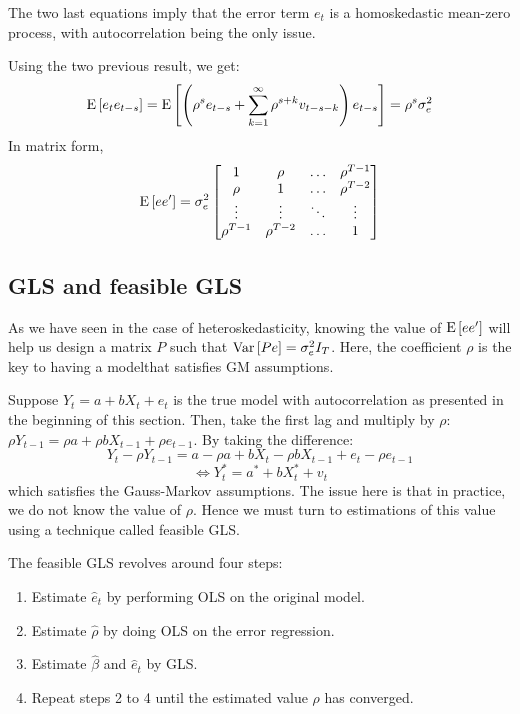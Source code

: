 The two last equations imply that the error term $e_t$ is a homoskedastic mean-zero process, with autocorrelation being the only issue.

Using the two previous result, we get: $$\operatorname{E}\left[e_te_{t-s}\right] = \operatorname{E}\left[\left(\rho^s e_{t-s} + \sum_{k=1}^{\infty} \rho^{s+k} v_{t-s-k}\right)e_{t-s}\right] = \rho^s \sigma_e^2 $$ In matrix form, \begin{align*}
\operatorname{E}\left[ee'\right] = \sigma_e^2 \begin{bmatrix}
1 & \rho & \hdots & \rho^{T-1} \\
\rho & 1 & \hdots & \rho^{T-2} \\
\vdots & \vdots	& \ddots & \vdots\\
\rho^{T-1} & \rho^{T-2} & \hdots & 1
\end{bmatrix}
\end{align*}

\subsection{GLS and feasible GLS}

As we have seen in the case of heteroskedasticity, knowing the value of $\operatorname{E}\left[ee'\right]$ will help us design a matrix $P$ such that $\operatorname{Var}\left[Pe\right] = \sigma_e^2 I_T$. Here, the coefficient $\rho$ is the key to having a modelthat satisfies GM assumptions.

Suppose $Y_t = a + bX_t + e_t$ is the true model with autocorrelation as presented in the beginning of this section. Then, take the first lag and multiply by $\rho$: $\rho Y_{t-1} = \rho a + \rho b X_{t-1} + \rho e_{t-1}$. By taking the difference: $$Y_t - \rho Y_{t-1} = a - \rho a + bX_t - \rho b X_{t-1} + e_t - \rho e_{t-1} $$ $$\Leftrightarrow Y_t^* = a^* + b X_t^* + v_t $$ which satisfies the Gauss-Markov assumptions. The issue here is that in practice, we do not know the value of $\rho$. Hence we must turn to estimations of this value using a technique called feasible GLS.

The feasible GLS revolves around four steps:\begin{enumerate}
\item Estimate $\hat e_t$ by performing OLS on the original model.
\item Estimate $\hat\rho$ by doing OLS on the error regression.
\item Estimate $\hat\beta$ and $\hat e_t$ by GLS.
\item Repeat steps 2 to 4 until the estimated value $\rho$ has converged.
\end{enumerate}

